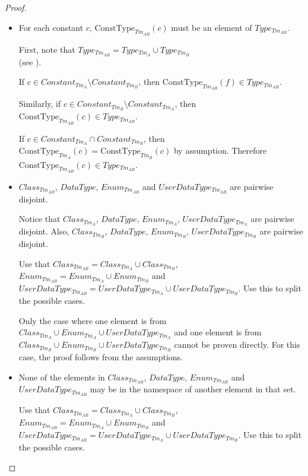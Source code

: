 \begin{proof}
\begin{itemize}
    
    \item For each constant $c$, $\mathrm{ConstType}_{Tm_{AB}}(c)$ must be an element of $Type_{Tm_{AB}}$.
    
    First, note that $Type_{Tm_{AB}} = Type_{Tm_A} \cup Type_{Tm_B}$\\(see ).
    
    If $c \in Constant_{Tm_A} \setminus Constant_{Tm_B}$, then $\mathrm{ConstType}_{Tm_{AB}}(f) \in Type_{Tm_{AB}}$.
    
    Similarly, if $c \in Constant_{Tm_B} \setminus Constant_{Tm_A}$, then $\mathrm{ConstType}_{Tm_{AB}}(c) \in Type_{Tm_{AB}}$.
    
    If $c \in Constant_{Tm_A} \cap Constant_{Tm_B}$, then $\mathrm{ConstType}_{Tm_A}(c) = \mathrm{ConstType}_{Tm_B}(c)$ by assumption. Therefore $\mathrm{ConstType}_{Tm_{AB}}(c) \in Type_{Tm_{AB}}$.
    
    
    \item $Class_{Tm_{AB}}$, $DataType$, $Enum_{Tm_{AB}}$ and $UserDataType_{Tm_{AB}}$ are pairwise disjoint.
    
    Notice that $Class_{Tm_{A}}$, $DataType$, $Enum_{Tm_{A}}$, $UserDataType_{Tm_{A}}$ are pairwise disjoint. Also, $Class_{Tm_{B}}$, $DataType$, $Enum_{Tm_{B}}$, $UserDataType_{Tm_{B}}$ are pairwise disjoint.
    
    Use that $Class_{Tm_{AB}} = Class_{Tm_{A}} \cup Class_{Tm_{B}}$, $Enum_{Tm_{AB}} = Enum_{Tm_{A}} \cup Enum_{Tm_{B}}$ and\\ $UserDataType_{Tm_{AB}} = UserDataType_{Tm_{A}} \cup UserDataType_{Tm_{B}}$. Use this to split the possible cases.
    
    Only the case where one element is from $Class_{Tm_{A}} \cup Enum_{Tm_{A}} \cup UserDataType_{Tm_{A}}$ and one element is from $Class_{Tm_{B}} \cup Enum_{Tm_{B}} \cup UserDataType_{Tm_{B}}$ cannot be proven directly. For this case, the proof follows from the assumptions.
    
    
    \item None of the elements in $Class_{Tm_{AB}}$, $DataType$, $Enum_{Tm_{AB}}$ and $UserDataType_{Tm_{AB}}$ may be in the namespace of another element in that set.
    
    Use that $Class_{Tm_{AB}} = Class_{Tm_{A}} \cup Class_{Tm_{B}}$, $Enum_{Tm_{AB}} = Enum_{Tm_{A}} \cup Enum_{Tm_{B}}$ and\\ $UserDataType_{Tm_{AB}} = UserDataType_{Tm_{A}} \cup UserDataType_{Tm_{B}}$. Use this to split the possible cases.
    

\end{itemize}
\end{proof}
